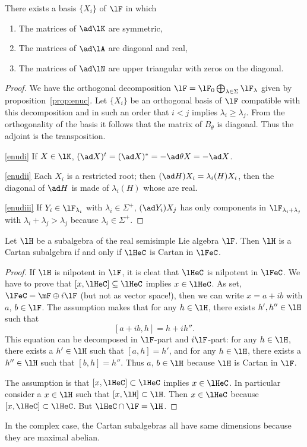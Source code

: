 \begin{lemma}
There exists a basis $\{X_i\}$ of $\lF$ in which

\begin{enumerate}
\item\label{enudi} The matrices of $\ad\lK$ are symmetric,
\item\label{enudii} The matrices of $\ad\lA$ are diagonal and real,
\item\label{enudiii} The matrices of $\ad\lN$ are upper triangular with zeros on the diagonal.
\end{enumerate}
\end{lemma}

\begin{proof}
We have the orthogonal decomposition $\lF=\lF_0\bigoplus_{\lambda\in\Sigma}\lF_{\lambda}$ given by proposition~\ref{prop:enuc}. Let $\{X_i\}$ be an orthogonal basis of $\lF$ compatible with this decomposition and in such an order that $i<j$ implies $\lambda_i\geq\lambda_j$. From the orthogonality of the basis it follows that the matrix of $B_{\theta}$ is diagonal. Thus the adjoint is the transposition.

\ref{enudi} If $X\in\lK$, $(\ad X)^t=(\ad X)^*=-\ad\theta X=-\ad X$.

\ref{enudii} Each $X_i$ is a restricted root; then $(\ad H)X_i=\lambda_i(H)X_i$, then the diagonal of $\ad H$ is made of $\lambda_i(H)$ whose are real.

\ref{enudiii} If $Y_i\in\lF_{\lambda_i}$ with $\lambda_i\in\Sigma^+$, $(\ad Y_i)X_j$ has only components in $\lF_{\lambda_i+\lambda_j}$ with $\lambda_i+\lambda_j>\lambda_j$ because $\lambda_i\in\Sigma^+$.
\end{proof}


\begin{lemma}
Let $\lH$ be a subalgebra of the real semisimple Lie algebra $\lF$. Then $\lH$ is a Cartan subalgebra if and only if $\lHeC$ is Cartan in $\lFeC$.
\end{lemma}

\begin{proof}
 If $\lH$ is nilpotent in $\lF$, it is cleat that $\lHeC$ is nilpotent in $\lFeC$. We have to prove that $[x,\lHeC]\subseteq\lHeC$ implies $x\in\lHeC$. As set, $\lFeC=\mF\oplus i\lF$  (but not as vector space!), then we can write $x=a+ib$ with $a$, $b\in\lF$. The assumption makes that for any $h\in\lH$, there exists $h',h''\in\lH$ such that
\[
   [a+ib,h]=h+ih''.
\]
This equation can be decomposed in $\lF$-part and $i\lF$-part: for any $h\in\lH$, there exists a $h'\in\lH$ such that $[a,h]=h'$,  and for any $h\in\lH$, there exists a $h''\in\lH$ such that $[b,h]=h''$. Thus $a$, $b\in\lH$ because $\lH$ is Cartan in $\lF$.

 The assumption is that $[x,\lHeC]\subset\lHeC$ implies $x\in\lHeC$. In particular consider a $x\in\lH$ such that $[x,\lH]\subset\lH$. Then $x\in\lHeC$ because $[x,\lHeC]\subset\lHeC$. But $\lHeC\cap\lF=\lH$.
\end{proof}

In the complex case, the Cartan subalgebras all have same dimensions because they are maximal abelian.
